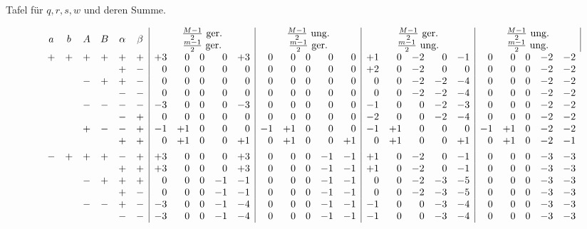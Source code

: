 \begin{center}Tafel für $q,r,s,w$ und deren Summe.\end{center}
\begingroup\scriptsize\setlength{\arraycolsep}{1.1pt}\renewcommand{\arraystretch}{1.12}
\[
\begin{array}{cccccc|rrrrr|rrrrr|rrrrr|rrrrr}
a&b&A&B&\alpha&\beta&\multicolumn{5}{c|}{\begin{array}{c}\frac{M-1}{2}\ \text{ger.}\\\frac{m-1}{2}\ \text{ger.}\end{array}}&\multicolumn{5}{c|}{\begin{array}{c}\frac{M-1}{2}\ \text{ung.}\\\frac{m-1}{2}\ \text{ger.}\end{array}}&\multicolumn{5}{c|}{\begin{array}{c}\frac{M-1}{2}\ \text{ger.}\\\frac{m-1}{2}\ \text{ung.}\end{array}}&\multicolumn{5}{c|}{\begin{array}{c}\frac{M-1}{2}\ \text{ung.}\\\frac{m-1}{2}\ \text{ung.}\end{array}}\\[4pt]
+&+&+&+&+&+&+3&0&0&0&+3&0&0&0&0&0&+1&0&-2&0&-1&0&0&0&-2&-2\\
&&&&+&-&0&0&0&0&0&0&0&0&0&0&+2&0&-2&0&0&0&0&0&-2&-2\\
&&-&+&+&-&0&0&0&0&0&0&0&0&0&0&0&0&-2&-2&-4&0&0&0&-2&-2\\
&&&&-&-&0&0&0&0&0&0&0&0&0&0&0&0&-2&-2&-4&0&0&0&-2&-2\\
&&-&-&-&-&-3&0&0&0&-3&0&0&0&0&0&-1&0&0&-2&-3&0&0&0&-2&-2\\
&&&&-&+&0&0&0&0&0&0&0&0&0&0&-2&0&0&-2&-4&0&0&0&-2&-2\\
&&+&-&-&+&-1&+1&0&0&0&-1&+1&0&0&0&-1&+1&0&0&0&-1&+1&0&-2&-2\\
&&&&+&+&0&+1&0&0&+1&0&+1&0&0&+1&0&+1&0&0&+1&0&+1&0&-2&-1\\[4pt]
-&+&+&+&-&+&+3&0&0&0&+3&0&0&0&-1&-1&+1&0&-2&0&-1&0&0&0&-3&-3\\
&&&&+&+&+3&0&0&0&+3&0&0&0&-1&-1&+1&0&-2&0&-1&0&0&0&-3&-3\\
&&-&+&+&+&0&0&0&-1&-1&0&0&0&-1&-1&0&0&-2&-3&-5&0&0&0&-3&-3\\
&&&&+&-&0&0&0&-1&-1&0&0&0&-1&-1&0&0&-2&-3&-5&0&0&0&-3&-3\\
&&-&-&+&-&-3&0&0&-1&-4&0&0&0&-1&-1&-1&0&0&-3&-4&0&0&0&-3&-3\\
&&&&-&-&-3&0&0&-1&-4&0&0&0&-1&-1&-1&0&0&-3&-4&0&0&0&-3&-3\\

\end{array}\]
